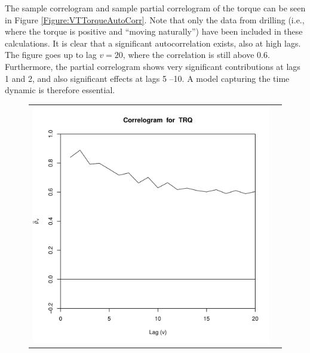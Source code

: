 The sample correlogram and sample partial correlogram of the torque can be seen in Figure \ref{Figure:VTTorqueAutoCorr}. Note that only the data from drilling (i.e., where the torque is positive and ``moving naturally'') have been included in these calculations. It is clear that a significant autocorrelation exists, also at high lags. The figure goes up to lag $v=20$, where the correlation is still above $0.6$. Furthermore, the partial correlogram shows very significant contributions at lags 1 and 2, and also significant effects at lags 5 --10. A model capturing the time dynamic is therefore essential. 

\begin{figure}[ht!]
\begin{center}
\begin{tabular}{c@{}c}
\includegraphics[scale=0.4]{./figures/Verdande_Corr_TRQ.pdf} &

\end{tabular}
\end{center}
\end{figure}
